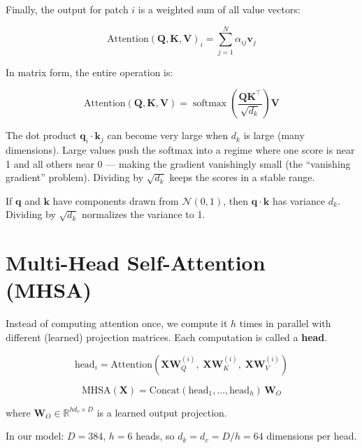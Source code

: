\documentclass[12pt, a4paper]{report}
\newcommand{\R}{\mathbb{R}}
\newcommand{\softmax}{\operatorname{softmax}}
\newcommand{\mat}[1]{\mathbf{#1}}
\newcommand{\vect}[1]{\bm{#1}}
\begin{document}
Finally, the output for patch $i$ is a weighted sum of all value vectors:

\begin{equation}
\text{Attention}(\mat{Q}, \mat{K}, \mat{V})_i = \sum_{j=1}^{N} \alpha_{ij} \vect{v}_j
\end{equation}

In matrix form, the entire operation is:

\begin{equation}
\text{Attention}(\mat{Q}, \mat{K}, \mat{V}) = \softmax\!\left(\frac{\mat{Q}\mat{K}^\top}{\sqrt{d_k}}\right)\mat{V}
\end{equation}

\begin{mathbox}
The dot product $\vect{q}_i \cdot \vect{k}_j$ can become very large when $d_k$ is large (many dimensions). Large values push the softmax into a regime where one score is near 1 and all others near 0 — making the gradient vanishingly small (the ``vanishing gradient'' problem). Dividing by $\sqrt{d_k}$ keeps the scores in a stable range.

If $\vect{q}$ and $\vect{k}$ have components drawn from $\mathcal{N}(0,1)$, then $\vect{q} \cdot \vect{k}$ has variance $d_k$. Dividing by $\sqrt{d_k}$ normalizes the variance to 1.
\end{mathbox}

\section{Multi-Head Self-Attention (MHSA)}

Instead of computing attention once, we compute it $h$ times in parallel with different (learned) projection matrices. Each computation is called a \textbf{head}.

\begin{equation}
\text{head}_i = \text{Attention}(\mat{X}\mat{W}_Q^{(i)},\; \mat{X}\mat{W}_K^{(i)},\; \mat{X}\mat{W}_V^{(i)})
\end{equation}

\begin{equation}
\text{MHSA}(\mat{X}) = \text{Concat}(\text{head}_1, \ldots, \text{head}_h)\, \mat{W}_O
\end{equation}

where $\mat{W}_O \in \R^{hd_v \times D}$ is a learned output projection.

In our model: $D = 384$, $h = 6$ heads, so $d_k = d_v = D/h = 64$ dimensions per head.
\end{document}
